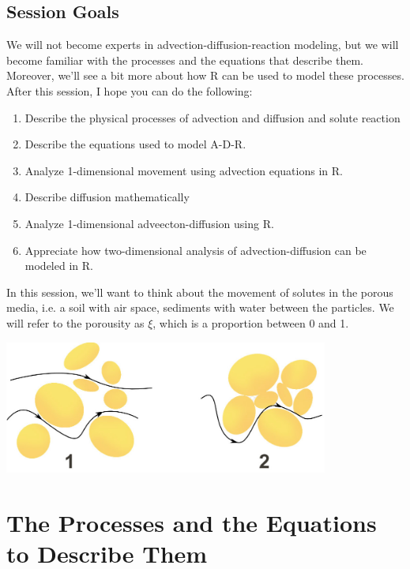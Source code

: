 \documentclass{tufte-handout}\usepackage[]{graphicx}\usepackage[]{xcolor}
\begin{document}
\subsection{Session Goals}

We will not become experts in advection-diffusion-reaction modeling, but we will become familiar with the processes and the equations that describe them. Moreover, we'll see a bit more about how R can be used to model these processes. After this session, I hope you can do the following:

\begin{enumerate}
	\item Describe the physical processes of advection and diffusion and solute reaction
	\item Describe the equations used to model A-D-R. 
	\item Analyze 1-dimensional movement using advection equations in R.
	\item Describe diffusion mathematically
	\item Analyze 1-dimensional adveecton-diffusion using R.
	\item Appreciate how two-dimensional analysis of advection-diffusion can be modeled in R.
\end{enumerate}

In this session, we'll want to think about the movement of solutes in the porous media, i.e. a soil with air space, sediments with water between the particles. We will refer to the porousity as $\xi$, which is a proportion between 0 and 1. 

\begin{marginfigure}
\centering
\includegraphics[width=0.8\textwidth]{graphics/Darcy_permeability.jpg}
\end{marginfigure}


\section{The Processes and the Equations to Describe Them}
\end{document}
